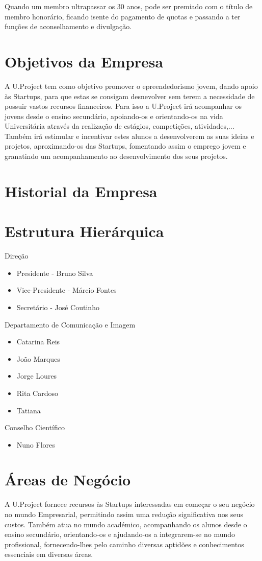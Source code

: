 \documentclass[11pt]{report}
\begin{document}
Quando um membro ultrapassar os 30 anos, pode ser premiado com o título de membro honorário, ficando isente do pagamento de quotas e passando a ter funções de aconselhamento e divulgação.

\section{Objetivos da Empresa}
A U.Project tem como objetivo promover o epreendedorismo jovem, dando apoio às Startups, para que estas se consigam desnevolver sem terem a necessidade de possuir vastos recursos financeiros.
Para isso a U.Project irá acompanhar os jovens desde o ensino secundário, apoiando-os e orientando-os na vida Universitária através da realização de estágios, competições, atividades,...
Também irá estimular e incentivar estes alunos a desenvolverem as suas ideias e projetos, aproximando-os das Startups, fomentando assim o emprego jovem e granatindo um acompanhamento ao desenvolvimento dos seus projetos.

\section{Historial da Empresa}

\section{Estrutura Hierárquica}

Direção
\begin{itemize}
\item Presidente - Bruno Silva
\item Vice-Presidente - Márcio Fontes
\item Secretário - José Coutinho
\end{itemize}
Departamento de Comunicação e Imagem
\begin{itemize}
\item Catarina Reis
\item João Marques
\item Jorge Loures
\item Rita Cardoso
\item Tatiana
\end{itemize}
Conselho Científico
\begin{itemize}
\item Nuno Flores
\end{itemize}

\section{Áreas de Negócio}
A U.Project fornece recursos às Startups interessadas em começar o seu negócio no mundo Empresarial, permitindo assim uma redução significativa nos seus custos.
Também atua no mundo académico, acompanhando os alunos desde o ensino secundário, orientando-os e ajudando-os a integrarem-se no mundo profissional, fornecendo-lhes pelo caminho diversas aptidões e conhecimentos essenciais em diversas áreas.
\end{document}
